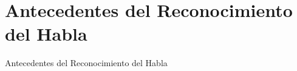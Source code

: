 \section*{Antecedentes del Reconocimiento del Habla}

\begin{frame}{Antecedentes del Reconocimiento del Habla}



\end{frame}
